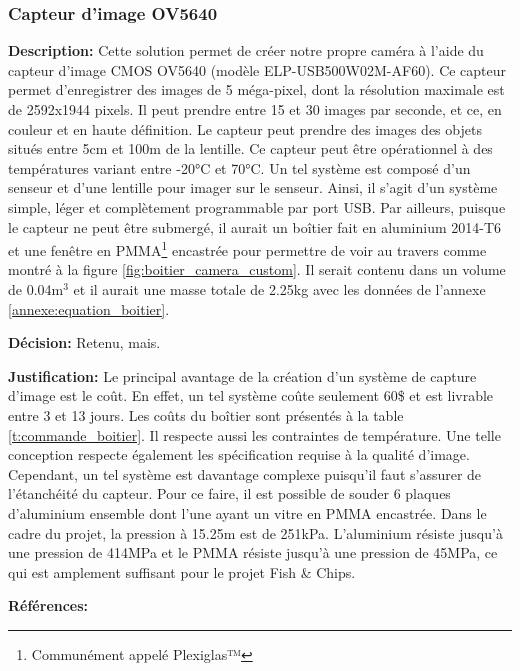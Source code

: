 \subsubsection{Capteur d'image OV5640}
\label{subsubsection:camera_custom}

\textbf{Description:} Cette solution permet de créer notre propre caméra à l'aide du capteur d'image CMOS OV5640 (modèle ELP-USB500W02M-AF60). Ce capteur permet d'enregistrer des images de 5 méga-pixel, dont la résolution maximale est de 2592x1944 pixels. Il peut prendre entre 15 et 30 images par seconde, et ce, en couleur et en haute définition. Le capteur peut prendre des images des objets situés entre 5cm et 100m de la lentille. Ce capteur peut être opérationnel à des températures variant entre -20°C et 70°C. Un tel système est composé d'un senseur et d'une lentille pour imager sur le senseur. Ainsi, il s'agit d'un système simple, léger et complètement programmable par port USB. Par ailleurs, puisque le capteur ne peut être submergé, il aurait un boîtier fait en aluminium 2014-T6 et une fenêtre en PMMA\footnote{Communément appelé Plexiglas™} encastrée pour permettre de voir au travers comme montré à la figure \ref{fig:boitier_camera_custom}. Il serait contenu dans un volume de 0.04m$^3$ et il aurait une masse totale de 2.25kg avec les données de l'annexe \ref{annexe:equation_boitier}.

\textbf{Décision:} Retenu, mais.

\textbf{Justification:} Le principal avantage de la création d'un système de capture d'image est le coût. En effet, un tel système coûte seulement 60\$ et est livrable entre 3 et 13 jours. Les coûts du boîtier sont présentés à la table \ref{t:commande_boitier}. Il respecte aussi les contraintes de température. Une telle conception respecte également les spécification requise à la qualité d'image. Cependant, un tel système est davantage complexe puisqu'il faut s'assurer de l'étanchéité du capteur. Pour ce faire, il est possible de souder 6 plaques d'aluminium ensemble dont l'une ayant un vitre en PMMA encastrée. Dans le cadre du projet, la pression à 15.25m est de 251kPa. L'aluminium résiste jusqu'à une pression de 414MPa et le PMMA résiste jusqu'à une pression de 45MPa, ce qui est amplement suffisant pour le projet Fish \& Chips.

\textbf{Références:} \cite{OV5640} \cite{OV5640_coûts} \cite{ASM} \cite{Glass}

